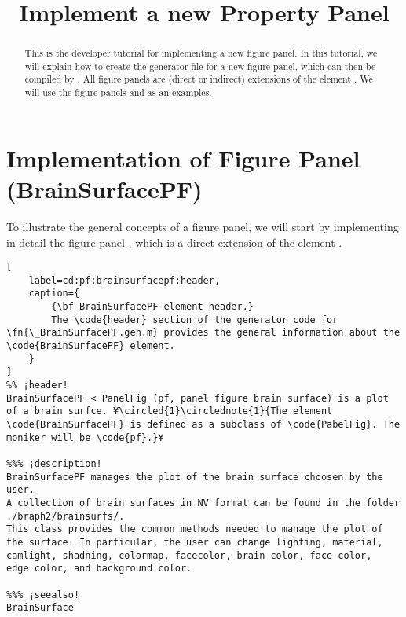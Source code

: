\documentclass{tufte-handout}
\title{Implement a new Property Panel}
\begin{document}
\maketitle

\begin{abstract}
\noindent
This is the developer tutorial for implementing a new figure panel. 
In this tutorial, we will explain how to create the generator file  for a new figure panel, which can then be compiled by . 
All figure panels are (direct or indirect) extensions of the element .
We will use the figure panels  and  as an examples.
\end{abstract}

\tableofcontents

\clearpage
\section{Implementation of Figure Panel (BrainSurfacePF)}

To illustrate the general concepts of a figure panel, we will start by implementing in detail the figure panel , which is a direct extension of the element .

\begin{lstlisting}[
	label=cd:pf:brainsurfacepf:header,
	caption={
		{\bf BrainSurfacePF element header.}
		The \code{header} section of the generator code for \fn{\_BrainSurfacePF.gen.m} provides the general information about the \code{BrainSurfacePF} element.
	}
]
%% ¡header!
BrainSurfacePF < PanelFig (pf, panel figure brain surface) is a plot of a brain surfce. ¥\circled{1}\circlednote{1}{The element \code{BrainSurfacePF} is defined as a subclass of \code{PabelFig}. The moniker will be \code{pf}.}¥

%%% ¡description!
BrainSurfacePF manages the plot of the brain surface choosen by the user. 
A collection of brain surfaces in NV format can be found in the folder 
./braph2/brainsurfs/.
This class provides the common methods needed to manage the plot of 
the surface. In particular, the user can change lighting, material, 
camlight, shadning, colormap, facecolor, brain color, face color, 
edge color, and background color. 

%%% ¡seealso!
BrainSurface
\end{lstlisting}
\end{document}
